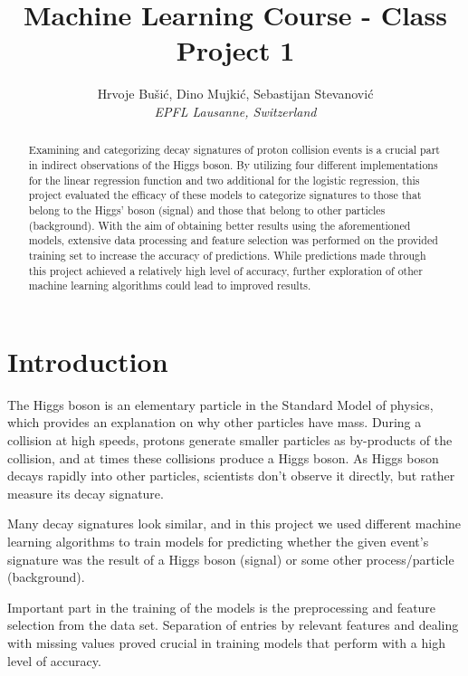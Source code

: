 \documentclass[10pt,conference,compsocconf]{IEEEtran}
\begin{document}
\title{Machine Learning Course - Class Project 1}

\author{
  Hrvoje Bušić, Dino Mujkić, Sebastijan Stevanović\\
  \textit{EPFL Lausanne, Switzerland}
}

\maketitle

\begin{abstract}
Examining and categorizing decay signatures of proton collision events is a crucial part in indirect observations of the Higgs boson. By utilizing four different implementations for the linear regression function and two additional for the logistic regression, this project evaluated the efficacy of these models to categorize signatures to those that belong to the Higgs' boson (signal) and those that belong to other particles (background). With the aim of obtaining better results using the aforementioned models, extensive data processing and feature selection was performed on the provided training set to increase the accuracy of predictions. While predictions made through this project achieved a relatively high level of accuracy, further exploration of other machine learning algorithms could lead to improved results. 
\end{abstract}

\section{Introduction}

The Higgs boson is an elementary particle in the Standard Model of physics, which provides an explanation on why other particles have mass. During a collision at high speeds, protons generate smaller particles as by-products of the collision, and at times these collisions produce a Higgs boson. As Higgs boson decays rapidly into other particles, scientists don't observe it directly, but rather measure its decay signature. 

Many decay signatures look similar, and in this project we used different machine learning algorithms to train models for predicting whether the given event's signature was the result of a Higgs boson (signal) or some other process/particle (background).

Important part in the training of the models is the preprocessing and feature selection from the data set. Separation of entries by relevant features and dealing with missing values proved crucial in training models that perform with a high level of accuracy.
\end{document}
